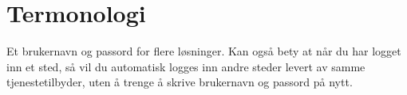 \chapter{Termonologi}
\label{app:termonologi}


\label{app:termonologi_singleSignOn}
Et brukernavn og passord for flere løsninger. Kan også bety at når du har logget inn et sted, så vil du automatisk logges inn andre steder levert av samme tjenestetilbyder, uten å trenge å skrive brukernavn og passord på nytt.
